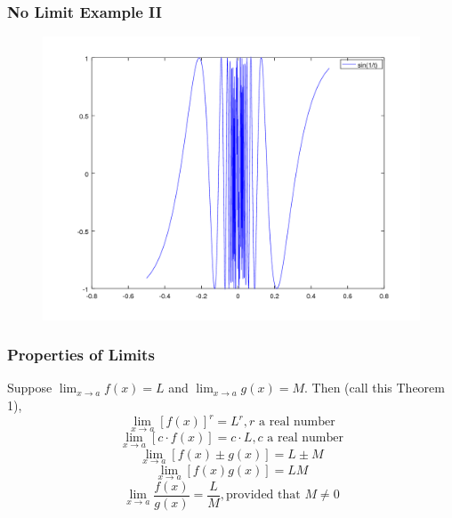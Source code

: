 \documentclass[xcolor=dvipsnames]{beamer}
\begin{document}
\begin{frame}
  \frametitle{No Limit Example II}
  \begin{figure}[h]
    \includegraphics[scale=.5]{./sineoneoverx.png}
  \end{figure}
\end{frame}

\begin{frame}
  \frametitle{Properties of Limits}
  Suppose $\lim_{x\rightarrow{}a}f(x)=L$ and
  $\lim_{x\rightarrow{}a}g(x)=M$. Then (call this \alert{Theorem 1}),
\begin{equation}
  \label{eq:johvoohu}
  \lim_{x\rightarrow{}a}[f(x)]^{r}=L^{r},r\mbox{ a real number}
\end{equation}
\begin{equation}
  \label{eq:eeyootoh}
  \lim_{x\rightarrow{}a}[c\cdot{}f(x)]=c\cdot{}L,c\mbox{ a real number}
\end{equation}
\begin{equation}
  \label{eq:kohzahwa}
  \lim_{x\rightarrow{}a}[f(x)\pm{}g(x)]=L\pm{}M
\end{equation}
\begin{equation}
  \label{eq:aekaqued}
  \lim_{x\rightarrow{}a}[f(x)g(x)]=LM
\end{equation}
\begin{equation}
  \label{eq:ahkeigae}
  \lim_{x\rightarrow{}a}\frac{f(x)}{g(x)}=\frac{L}{M},\mbox{provided that }M\neq{}0
\end{equation}
\end{frame}
\end{document}
